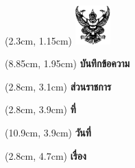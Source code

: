 \documentclass{article}
\begin{document}
\fontsize{16pt}{16pt}\selectfont


\begin{textblock*}{15cm}(2.3cm, 1.15cm)  %
\includegraphics[height=1.5cm]{Bird.png} %
\end{textblock*}

\begin{textblock*}{15cm}(8.85cm, 1.95cm)  %
{\fontsize{29pt}{29pt}\textbf{บันทึกข้อความ}}
\end{textblock*}



\begin{textblock*}{15cm}(2.8cm, 3.1cm)  %
\noindent
{\fontsize{20pt}{24pt}\selectfont\textbf{ส่วนราชการ}} 
\hspace{-0.2cm} 
{} \\[1.5ex]
\end{textblock*}


\begin{textblock*}{15cm}(2.8cm, 3.9cm)  %
\noindent
{\fontsize{20pt}{24pt}\selectfont\textbf{ที่}} 
\hspace{-0.2cm} 
{} \\[1.5ex]
\end{textblock*}

\begin{textblock*}{15cm}(10.9cm, 3.9cm)  %
\noindent
{\fontsize{20pt}{24pt}\selectfont\textbf{วันที่}} 
\hspace{-0.25cm} 
{} \\[1.5ex]
\end{textblock*}

\begin{textblock*}{16cm}(2.8cm, 4.7cm)  %
\noindent
{\fontsize{20pt}{24pt}\selectfont\textbf{เรื่อง}} 
\hspace{-0.15cm} 
{} \\[1.5ex]
\end{textblock*}
\end{document}
